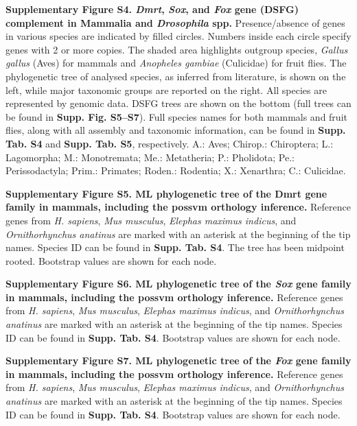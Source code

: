 \documentclass[../main.tex]{subfiles}
\begin{document}
{    \noindent\textbf{Supplementary Figure S4. \textit{Dmrt}, \textit{Sox}, and \textit{Fox} gene (DSFG) complement in Mammalia and \textit{Drosophila} spp.} Presence/absence of genes in various species are indicated by filled circles. Numbers inside each circle specify genes with 2 or more copies. The shaded area highlights outgroup species, \textit{Gallus gallus} (Aves) for mammals and \textit{Anopheles gambiae} (Culicidae) for fruit flies. The phylogenetic tree of analysed species, as inferred from literature, is shown on the left, while major taxonomic groups are reported on the right. All species are represented by genomic data. DSFG trees are shown on the bottom (full trees can be found in \textbf{Supp. Fig. S5--S7}). Full species names for both mammals and fruit flies, along with all assembly and taxonomic information, can be found in \textbf{Supp. Tab. S4} and \textbf{Supp. Tab. S5}, respectively. A.: Aves; Chirop.: Chiroptera; L.: Lagomorpha; M.: Monotremata; Me.: Metatheria; P.: Pholidota; Pe.: Perissodactyla; Prim.: Primates; Roden.: Rodentia; X.: Xenarthra; C.: Culicidae.
    
    \vspace{5mm}

    \noindent\textbf{Supplementary Figure S5. ML phylogenetic tree of the Dmrt gene family in mammals, including the possvm orthology inference.} Reference genes from \textit{H. sapiens}, \textit{Mus musculus}, \textit{Elephas maximus indicus}, and \textit{Ornithorhynchus anatinus} are marked with an asterisk at the beginning of the tip names. Species ID can be found in \textbf{Supp. Tab. S4}. The tree has been midpoint rooted. Bootstrap values are shown for each node.
    
    \vspace{5mm}

    \noindent\textbf{Supplementary Figure S6. ML phylogenetic tree of the \textit{Sox} gene family in mammals, including the possvm orthology inference.} Reference genes from \textit{H. sapiens}, \textit{Mus musculus}, \textit{Elephas maximus indicus}, and \textit{Ornithorhynchus anatinus} are marked with an asterisk at the beginning of the tip names. Species ID can be found in \textbf{Supp. Tab. S4}. Bootstrap values are shown for each node.
    
    \vspace{5mm}

    \noindent\textbf{Supplementary Figure S7. ML phylogenetic tree of the \textit{Fox} gene family in mammals, including the possvm orthology inference.} Reference genes from \textit{H. sapiens}, \textit{Mus musculus}, \textit{Elephas maximus indicus}, and \textit{Ornithorhynchus anatinus} are marked with an asterisk at the beginning of the tip names. Species ID can be found in \textbf{Supp. Tab. S4}. Bootstrap values are shown for each node.
    
}
\end{document}
